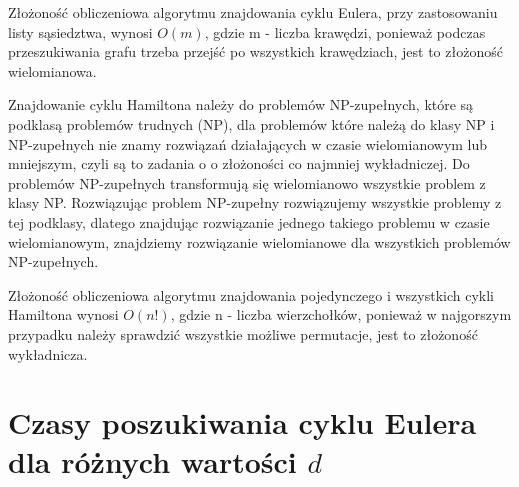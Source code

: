 \documentclass[polish,polish,a4paper]{article}
\begin{document}
\begin{spacing}{1.25}
	Złożoność obliczeniowa algorytmu znajdowania cyklu Eulera, przy zastosowaniu listy sąsiedztwa, wynosi $O(m)$, gdzie m - liczba krawędzi, ponieważ podczas przeszukiwania grafu trzeba przejść po wszystkich krawędziach, jest to złożoność wielomianowa.
	
	Znajdowanie cyklu Hamiltona należy do problemów NP-zupełnych, które są podklasą problemów trudnych (NP), dla problemów które należą do klasy NP i NP-zupełnych nie znamy rozwiązań działających w czasie wielomianowym lub mniejszym, czyli są to zadania o o złożoności co najmniej wykładniczej. Do problemów NP-zupełnych transformują się wielomianowo wszystkie problem z klasy NP. Rozwiązując problem NP-zupełny rozwiązujemy wszystkie problemy z tej podklasy, dlatego znajdując rozwiązanie jednego takiego problemu w czasie wielomianowym, znajdziemy rozwiązanie wielomianowe dla wszystkich problemów NP-zupełnych.
	

	
	Złożoność obliczeniowa algorytmu znajdowania pojedynczego i wszystkich cykli Hamiltona wynosi $O(n!)$, gdzie n - liczba wierzchołków, ponieważ w najgorszym przypadku należy sprawdzić wszystkie możliwe permutacje, jest to złożoność wykładnicza.
	

	
\section{Czasy poszukiwania cyklu Eulera dla różnych wartości $d$}


\begin{spacing}{1.3}
	{
		\centering
}
\end{spacing}
\end{spacing}
\end{document}
